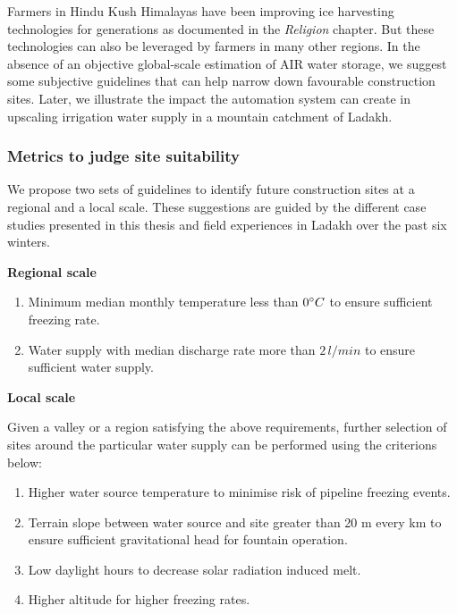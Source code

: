 Farmers in Hindu Kush Himalayas have been improving ice harvesting technologies for generations as documented in
the \textit{Religion} chapter. But these technologies can also be leveraged by farmers in many other regions. In
the absence of an objective global-scale estimation of AIR water storage, we suggest some subjective guidelines
that can help narrow down favourable construction sites. Later, we illustrate the impact the automation system
can create in upscaling irrigation water supply in a mountain catchment of Ladakh.

\subsubsection{Metrics to judge site suitability}

We propose two sets of guidelines to identify future construction sites at a regional and a local scale. These
suggestions are guided by the different case studies presented in this thesis and field experiences in
Ladakh over the past six winters.

\textbf{Regional scale}

\begin{enumerate}

	\item Minimum median monthly temperature less than $0 ^{\circ} C$ to ensure sufficient freezing rate.
	\item Water supply with median discharge rate more than $2\, l/min$ to ensure sufficient water supply.

\end{enumerate}

\textbf{Local scale}

Given a valley or a region satisfying the above requirements, further selection of sites around the particular
water supply can be performed using the criterions below:

\begin{enumerate}
	\item Higher water source temperature to minimise risk of pipeline freezing events.
	\item Terrain slope between water source and site greater than 20 m every km to ensure sufficient
    gravitational head for fountain operation.
	\item Low daylight hours to decrease solar radiation induced melt.
	\item Higher altitude for higher freezing rates.
\end{enumerate}

